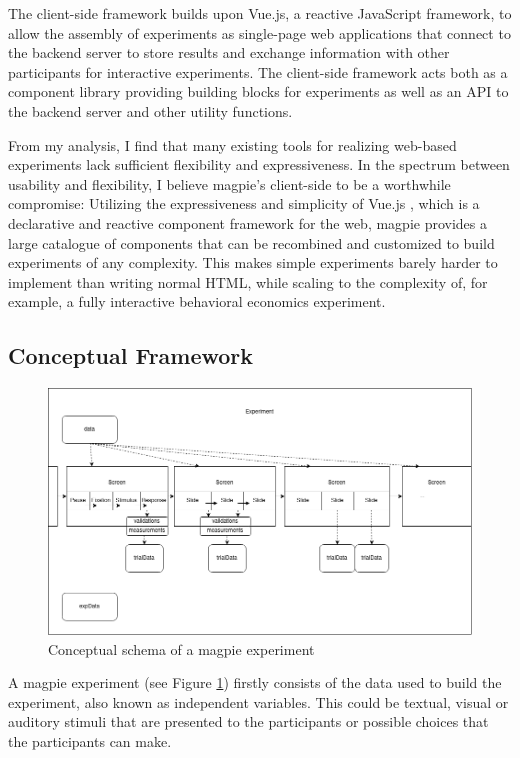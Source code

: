 \documentclass[a4paper,11pt]{scrreprt}
\begin{document}
The client-side framework builds upon Vue.js, a reactive JavaScript framework, to allow the assembly of experiments as single-page web applications that connect to the backend server to store results and exchange information with other participants for interactive experiments. The client-side framework acts both as a component library providing building blocks for experiments as well as an API to the backend server and other utility functions.

From my analysis, I find that many existing tools for realizing web-based experiments lack sufficient flexibility and expressiveness. In the spectrum between usability and flexibility, I believe magpie's client-side to be a worthwhile compromise: Utilizing the expressiveness and simplicity of Vue.js \citep{You2014}, which is a declarative and reactive component framework for the web, magpie provides a large catalogue of components that can be recombined and customized to build experiments of any complexity. This makes simple experiments barely harder to implement than writing normal HTML, while scaling to the complexity of, for example, a fully interactive behavioral economics experiment.

\subsection{Conceptual Framework}

\begin{figure}[h]
\includegraphics[width=\textwidth]{experiments_schema.png}
\caption{Conceptual schema of a magpie experiment}
\label{fig:concepts}
\end{figure}

A magpie experiment (see Figure \ref{fig:concepts}) firstly consists of the data used to build the experiment, also known as independent variables.
This could be textual, visual or auditory stimuli that are presented to the participants or possible choices that the participants can make.
\end{document}
